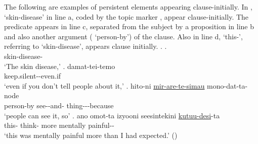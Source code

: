 The following are examples of persistent elements appearing clause-initially.
In \Next,
 `skin-disease' in line a, coded by the topic marker ,
appear clause-initially.
The predicate appears in line c,
separated from the subject by a proposition in line b and also another argument ( `person-by') of the clause.
Also in line d,  `this-', referring to `skin-disease', appears clause initially.
%
\ex.
 \ag.  \\
 		skin-disease- \\
		`The skin disease,'
 \bg. damat-tei-temo \\
 		keep.silent--even.if \\
		`even if you don't tell people about it,'
 \bg. hito-ni \ul{mir-are-te-simau} mono-dat-ta-node \\
 		person-by see--and- thing---because \\
		`people can see it, so'
 \bg.  ano omot-ta izyooni seesintekini \ul{kutuu-desi}-ta \\
 		this-  think- more mentally painful-- \\
		`this was mentally painful more than I had expected.'
		\hfill{()}

